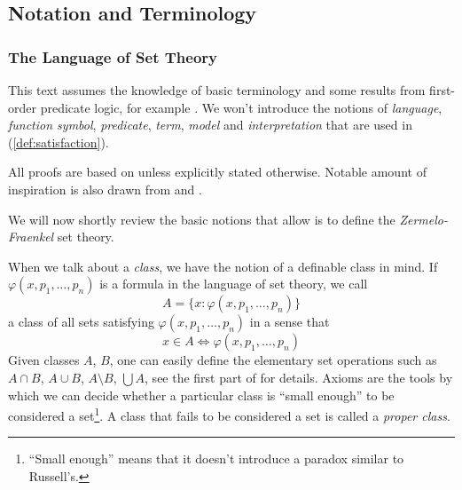 \subsection{Notation and Terminology}
\subsubsection{The Language of Set Theory}
This text assumes the knowledge of basic terminology and some results from first-order predicate logic, for example \cite{hamiltonBook}. We won't introduce the notions of \emph{language}, \emph{function symbol}, \emph{predicate}, \emph{term}, \emph{model} and \emph{interpretation} that are used in (\ref{def:satisfaction}).


All proofs are based on \cite{JechBook} unless explicitly stated otherwise. Notable amount of inspiration is also drawn from \cite{KanamoriBook} and \cite{DrakeBook}.

We will now shortly review the basic notions that allow is to define the \emph{Zermelo-Fraenkel} set theory.



When we talk about a \emph{class}, we have the notion of a definable class in mind. 
If $\varphi(x, p_1, \ldots, p_n)$ is a formula in the language of set theory, we call 
\begin{equation}
A = \{x : \varphi(x, p_1, \ldots, p_n)\}
\end{equation}
a class of all sets satisfying $\varphi(x, p_1, \ldots, p_n)$ in a sense that 
\begin{equation}
x \in A \iff \varphi(x, p_1, \ldots, p_n)
\end{equation}
Given classes $A$, $B$, one can easily define the elementary set operations such as $A \cap B$, $A \cup B$, $A \setminus B$, $\bigcup A$, see the first part of \cite{JechBook} for details.
Axioms are the tools by which we can decide whether a particular class is ``small enough'' to be considered a set\footnote{``Small enough'' means that it doesn't introduce a paradox similar to Russell's.}. A class that fails to be considered a set is called a \emph{proper class}.

